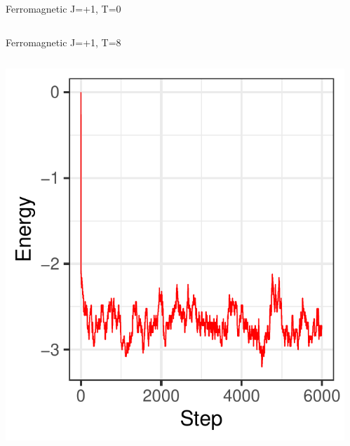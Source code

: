 \documentclass{beamer}
\begin{document}
\begin{frame}{Ferromagnetic J=+1, T=0}
\begin{columns}
\begin{column}{0.5\textwidth}
\begin{center}
     \end{center}
\end{column}
\end{columns}
\end{frame}

\begin{frame}{Ferromagnetic J=+1, T=8}
\begin{columns}
\begin{column}{0.5\textwidth}
    \begin{center}
     \includegraphics[width=\textwidth]{Pic/J+1_10_6000_T=8_ENERGY.pdf}
     \end{center}
\end{column}
\begin{column}{0.5\textwidth}
    \begin{center}

\end{center}
\end{column}
\end{columns}
\end{frame}
\end{document}
